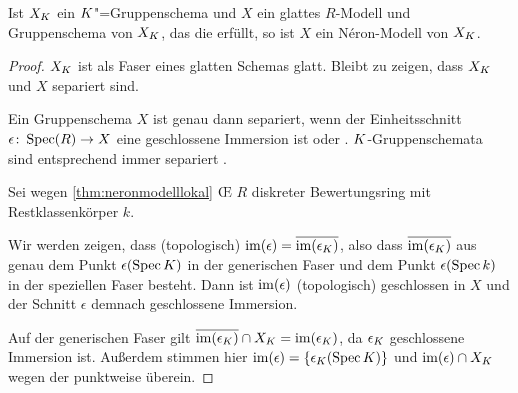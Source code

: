 \documentclass[german]{scrreprt}
\begin{document}
\begin{Bemerkung}\label{nerongruppenschemaglatt}
  Ist $X_{K}$ ein $K$"=Gruppenschema und $X$ ein
  glattes $R$-Modell und Gruppenschema von $X_{K}$, das die
  \NAbbEig erfüllt, so ist $X$ ein Néron-Modell von $X_{K}$.
  \begin{proof}
    $X_{K}$ ist als Faser eines glatten Schemas glatt. Bleibt zu
    zeigen, dass $X_{K}$ und $X$ separiert sind.
    
    Ein Gruppenschema $X$ ist genau dann separiert, wenn der
    Einheitsschnitt $\epsilon\colon\operatorname{Spec}(R)\to X$ eine geschlossene
    Immersion ist
    \cite[Lemma 38.6.1]{stacksproject} oder \cite[7.1, Lemma 2]{neron}.
    $K$-Gruppenschemata sind entsprechend immer separiert
    \cite[Lemma 38.7.3]{stacksproject}. 

    Sei wegen \ref{thm:neronmodelllokal} \OE{} $R$ diskreter
    Bewertungsring mit Restklassenkörper $k$.
    
    Wir werden zeigen, dass (topologisch)
    $\operatorname{im}(\epsilon)=\overline{\operatorname{im}(\epsilon_{K})}$,
    also dass $\overline{\operatorname{im}(\epsilon_{K})}$ aus genau dem Punkt
    $\epsilon(\operatorname{Spec}K)$ in der generischen Faser und dem Punkt
    $\epsilon(\operatorname{Spec} k)$ in der speziellen Faser besteht.
    Dann ist $\operatorname{im}(\epsilon)$ (topologisch) geschlossen in $X$ und der
    Schnitt $\epsilon$ demnach geschlossene Immersion.
    
    Auf der generischen Faser gilt
    $\overline{\operatorname{im}(\epsilon_{K})}\cap X_{K}=\operatorname{im}(\epsilon_{K})$,
    da $\epsilon_{K}$ geschlossene Immersion ist.
    Außerdem stimmen hier $\operatorname{im}(\epsilon)=\{\epsilon_{K}(\operatorname{Spec}K)\}$ und
    $\operatorname{im}(\epsilon)\cap X_{K}$ wegen der \NAbbEig punktweise
    überein.


\end{proof}
\end{Bemerkung}
\end{document}
